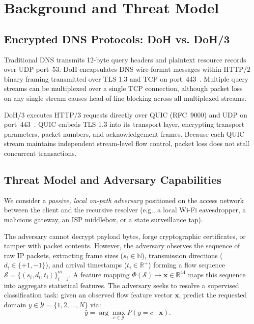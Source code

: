 \documentclass[conference,10pt]{IEEEtran}
\begin{document}
\section{Background and Threat Model}
\label{sec:background}

\subsection{Encrypted DNS Protocols: DoH vs. DoH/3}
Traditional DNS transmits 12-byte query headers and plaintext resource records over UDP port~53. DoH encapsulates DNS wire-format messages within HTTP/2 binary framing transmitted over TLS 1.3 and TCP on port~443~\cite{rfc8484}. Multiple query streams can be multiplexed over a single TCP connection, although packet loss on any single stream causes head-of-line blocking across all multiplexed streams.

DoH/3 executes HTTP/3 requests directly over QUIC (RFC~9000) and UDP on port~443~\cite{rfc9114,rfc9250}. QUIC embeds TLS 1.3 into its transport layer, encrypting transport parameters, packet numbers, and acknowledgement frames. Because each QUIC stream maintains independent stream-level flow control, packet loss does not stall concurrent transactions.

\subsection{Threat Model and Adversary Capabilities}
We consider a \emph{passive, local on-path adversary} positioned on the access network between the client and the recursive resolver (e.g., a local Wi-Fi eavesdropper, a malicious gateway, an ISP middlebox, or a state surveillance tap). 

The adversary cannot decrypt payload bytes, forge cryptographic certificates, or tamper with packet contents. However, the adversary observes the sequence of raw IP packets, extracting frame sizes ($s_i \in \mathbb{N}$), transmission directions ($d_i \in \{+1, -1\}$), and arrival timestamps ($t_i \in \mathbb{R}^+$) forming a flow sequence $\mathcal{S} = \{(s_i, d_i, t_i)\}_{i=1}^m$. A feature mapping $\Phi(\mathcal{S}) \to \mathbf{x} \in \mathbb{R}^{44}$ maps this sequence into aggregate statistical features. The adversary seeks to resolve a supervised classification task: given an observed flow feature vector $\mathbf{x}$, predict the requested domain $y \in \mathcal{Y} = \{1, 2, \dots, N\}$ via:
\begin{equation}
\hat{y} = \arg\max_{c \in \mathcal{Y}} P(y = c \mid \mathbf{x}).
\label{eq:classification}
\end{equation}
\end{document}
